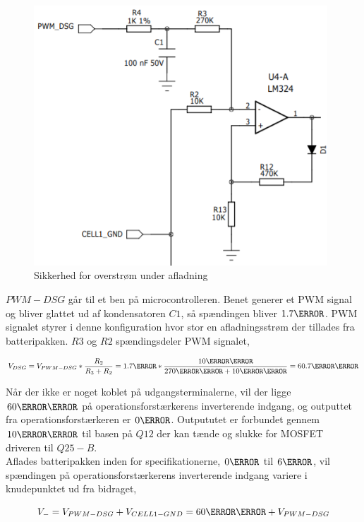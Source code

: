 \begin{figure}[h]
	\centering
	\includegraphics[width=11cm]{billeder/overcurrent_discharge.png}
	\caption{Sikkerhed for overstrøm under afladning}
	\label{fig:overcurrent_discharge}
\end{figure}

$PWM-DSG$ går til et ben på microcontrolleren. Benet generer et PWM signal og bliver glattet ud af kondensatoren $C1$, så spændingen bliver $1.7\volt$. PWM signalet styrer i denne konfiguration hvor stor en afladningsstrøm der tillades fra batteripakken. $R3$ og $R2$ spændingsdeler PWM signalet,

\begin {equation} 
V_{DSG} = V_{PWM-DSG} * \frac{R_{2}}{R_{3}+R_{2}} = 1.7\volt * \frac{10\kilo\ohm}{270\kilo\ohm + 10\kilo\ohm} = 60.7\milli\volt
\end {equation}

Når der ikke er noget koblet på udgangsterminalerne, vil der ligge $60\milli\volt$ på operationsforstærkerens inverterende indgang, og outputtet fra operationsforstærkeren er $0\volt$. Outpututet er forbundet gennem $10\kilo\ohm$ til basen på $Q12$ der kan tænde og slukke for MOSFET driveren til $Q25-B$.
\\

Aflades batteripakken inden for specifikationerne, $0\ampere$ til $6\ampere$, vil spændingen på operationsforstærkerens inverterende indgang variere i knudepunktet ud fra bidraget,

\begin {equation} 
V_{-} = V_{PWM-DSG} + V_{CELL1-GND} = 60\milli\volt + V_{PWM-DSG}
\end {equation}


